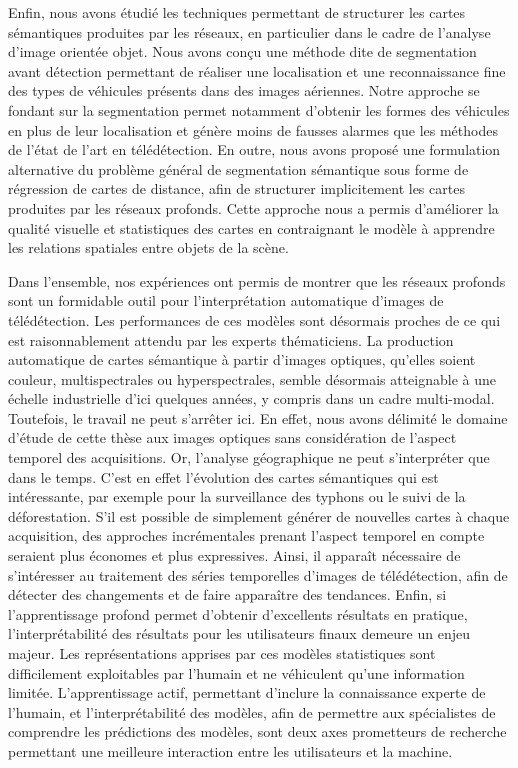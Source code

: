 Enfin, nous avons étudié les techniques permettant de structurer les cartes sémantiques produites par les réseaux, en particulier dans le cadre de l'analyse d'image orientée objet. Nous avons conçu une méthode dite de segmentation avant détection permettant de réaliser une localisation et une reconnaissance fine des types de véhicules présents dans des images aériennes. Notre approche se fondant sur la segmentation permet notamment d'obtenir les formes des véhicules en plus de leur localisation et génère moins de fausses alarmes que les méthodes de l'état de l'art en télédétection. En outre, nous avons proposé une formulation alternative du problème général de segmentation sémantique sous forme de régression de cartes de distance, afin de structurer implicitement les cartes produites par les réseaux profonds. Cette approche nous a permis d'améliorer la qualité visuelle et statistiques des cartes en contraignant le modèle à apprendre les relations spatiales entre objets de la scène.

Dans l'ensemble, nos expériences ont permis de montrer que les réseaux profonds sont un formidable outil pour l'interprétation automatique d'images de télédétection. Les performances de ces modèles sont désormais proches de ce qui est raisonnablement attendu par les experts thématiciens. La production automatique de cartes sémantique à partir d'images optiques, qu'elles soient couleur, multispectrales ou hyperspectrales, semble désormais atteignable à une échelle industrielle d'ici quelques années, y compris dans un cadre multi-modal. Toutefois, le travail ne peut s'arrêter ici. En effet, nous avons délimité le domaine d'étude de cette thèse aux images optiques sans considération  de l'aspect temporel des acquisitions. Or, l'analyse géographique ne peut s'interpréter que dans le temps. C'est en effet l'évolution des cartes sémantiques qui est intéressante, par exemple pour la surveillance des typhons ou le suivi de la déforestation. S'il est possible de simplement générer de nouvelles cartes à chaque acquisition, des approches incrémentales prenant l'aspect temporel en compte seraient plus économes et plus expressives. Ainsi, il apparaît nécessaire de s'intéresser au traitement des séries temporelles d'images de télédétection, afin de détecter des changements et de faire apparaître des tendances. Enfin, si l'apprentissage profond permet d'obtenir d'excellents résultats en pratique, l'interprétabilité des résultats pour les utilisateurs finaux demeure un enjeu majeur. Les représentations apprises par ces modèles statistiques sont difficilement exploitables par l'humain et ne véhiculent qu'une information limitée. L'apprentissage actif, permettant d'inclure la connaissance experte de l'humain, et l'interprétabilité des modèles, afin de permettre aux spécialistes de comprendre les prédictions des modèles, sont deux axes prometteurs de recherche permettant une meilleure interaction entre les utilisateurs et la machine.

\newpage
